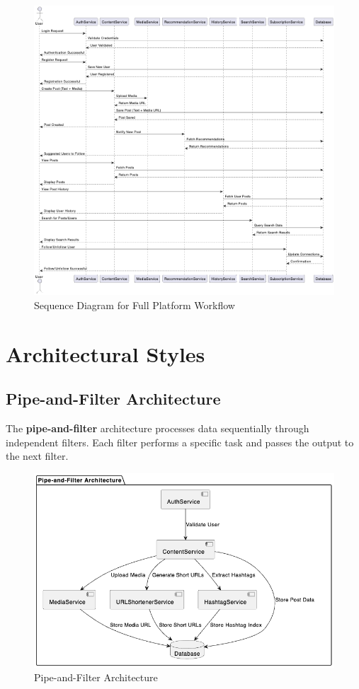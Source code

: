\documentclass[a4paper,12pt]{article}
\begin{document}
\begin{figure}[H]
    \centering
    \includegraphics[width=0.9\linewidth]{UML_1.png}
    \caption{Sequence Diagram for Full Platform Workflow}
    \label{fig:sequence-diagram}
\end{figure}

\section{Architectural Styles}

\subsection{Pipe-and-Filter Architecture}

The \textbf{pipe-and-filter} architecture processes data sequentially through independent filters. Each filter performs a specific task and passes the output to the next filter.

\begin{figure}[H]
    \centering
    \includegraphics[width=.75\linewidth]{pipe_filter_architecture.png}
    \caption{Pipe-and-Filter Architecture}
    \label{fig:pipe-filter}
\end{figure}
\end{document}
